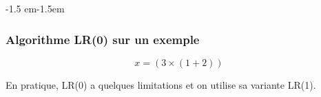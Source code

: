 \begin{frame}
    \vspace{1em}
    \begin{adjustwidth}{-1.5 em}{-1.5em}
    \begin{minipage}{0.7\textwidth}
        \maxsizebox{\textwidth}{0.8\textheight}{
            
        }
    \end{minipage}%
    \begin{minipage}{0.4\textwidth}
         {}
         {
            \maxsizebox{\textwidth}{0.7\textheight}{
                
            }
        }
    \end{minipage}
    \end{adjustwidth}
\end{frame}

\begin{frame}
    \frametitle{Algorithme LR(0) sur un exemple}

    \[x = (3 \times (1 + 2))\]

    \begin{center}
    \end{center}

    \pause
    En pratique, LR(0) a quelques limitations et on utilise sa variante LR(1).
\end{frame}

